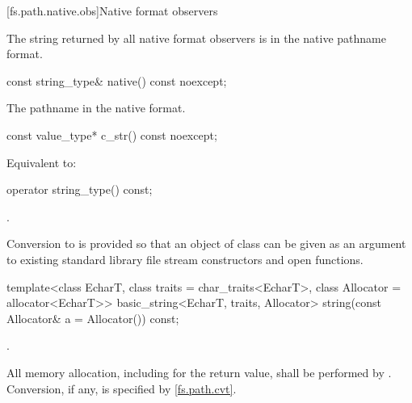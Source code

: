 [fs.path.native.obs]{Native format observers}

\pnum
The string returned by all native format observers is in the native pathname format.

%
\begin{itemdecl}
const string_type& native() const noexcept;
\end{itemdecl}

\begin{itemdescr}
\pnum
\returns
The pathname in the native format.
\end{itemdescr}

%
\begin{itemdecl}
const value_type* c_str() const noexcept;
\end{itemdecl}

\begin{itemdescr}
\pnum
\effects
Equivalent to: 
\end{itemdescr}

%
\begin{itemdecl}
operator string_type() const;
\end{itemdecl}

\begin{itemdescr}
\pnum
\returns
{}.

\pnum
\begin{note}
Conversion to  is provided so that an
  object of class  can be given as an argument to existing
  standard library file stream constructors and open functions.
\end{note}
\end{itemdescr}

%
\begin{itemdecl}
template<class EcharT, class traits = char_traits<EcharT>,
         class Allocator = allocator<EcharT>>
  basic_string<EcharT, traits, Allocator>
    string(const Allocator& a = Allocator()) const;
\end{itemdecl}

\begin{itemdescr}
\pnum
\returns
{}.

\pnum
\remarks
All memory allocation, including for the return value, shall
be performed by . Conversion, if any, is specified by
\ref{fs.path.cvt}.
\end{itemdescr}

